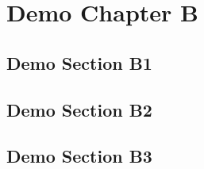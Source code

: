 

\chapter{Demo Chapter B}
\label{ch:ch3}
\lipsum[30-31]

\section{Demo Section B1}
\lipsum[32-33]


\section{Demo Section B2}
\lipsum[34-35]


\section{Demo Section B3}
\lipsum[36-37]

